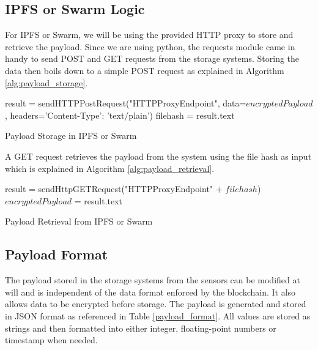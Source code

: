 \documentclass[11pt,openright]{report}
\begin{document}
\subsection{IPFS or Swarm Logic}

For IPFS or Swarm, we will be using the provided HTTP proxy to store and retrieve the payload. Since we are using python, the requests module came in handy to send POST and GET requests from the storage systems. Storing the data then boils down to a simple POST request as explained in Algorithm \ref{alg:payload_storage}.

\begin{algorithm}[setSwarmOrIPFSData]
  result = sendHTTPPostRequest("HTTPProxyEndpoint", data=$encryptedPayload$, headers={'Content-Type': 'text/plain'})\;
  filehash = result.text\;
 \caption{Payload Storage in IPFS or Swarm}
 \label{alg:payload_storage}
\end{algorithm}

A GET request retrieves the payload from the system using the file hash as input which is explained in Algorithm \ref{alg:payload_retrieval}.

\begin{algorithm}[getSwarmOrIPFSData]
  result = sendHttpGETRequest("HTTPProxyEndpoint" + $filehash$)\;
  $encryptedPayload$ = result.text\;
 \caption{Payload Retrieval from IPFS or Swarm}
 \label{alg:payload_retrieval}
\end{algorithm}

\subsection{Payload Format} \label{ss:payload_format}
The payload stored in the storage systems from the sensors can be modified at will and is independent of the data format enforced by the blockchain. It also allows data to be encrypted before storage. The payload is generated and stored in JSON format as referenced in Table \ref{payload_format}. All values are stored as strings and then formatted into either integer, floating-point numbers or timestamp when needed.
\end{document}
